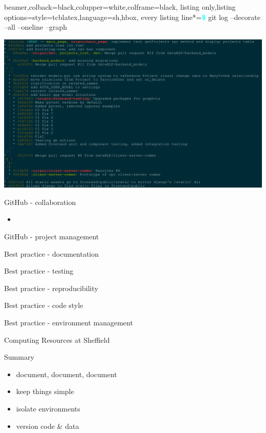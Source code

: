 \documentclass{beamer} %
\begin{document}
  \begin{frame}[fragile]
    \begin{tcblisting}{beamer,colback=black,colupper=white,colframe=black,
      listing only,listing options={style=tcblatex,language=sh},hbox,
      every listing line*={\textcolor{cyan}{\small\ttfamily\bfseries\$}}}
  git log --decorate --all --oneline --graph
    \end{tcblisting}
    \includegraphics[height=.9\textheight]{git_log_tree_output.png}
  \end{frame}


  \begin{frame}{GitHub - collaboration}
    \begin{itemize}
      \item 
    \end{itemize}
  \end{frame}

  \begin{frame}{GitHub - project management}
  \end{frame}

  \begin{frame}{Best practice - documentation}
  \end{frame}

  \begin{frame}{Best practice - testing}
  \end{frame}

  \begin{frame}{Best practice - reproducibility}
  \end{frame}

  \begin{frame}{Best practice - code style}
  \end{frame}

  \begin{frame}{Best practice - environment management}
  \end{frame}

  \begin{frame}{Computing Resources at Sheffield}
  \end{frame}

  \begin{frame}{Summary}
    \begin{itemize}
      \item document, document, document
      \item keep things simple
      \item isolate environments
      \item version code \& data
    \end{itemize}
  \end{frame}
\end{document}

